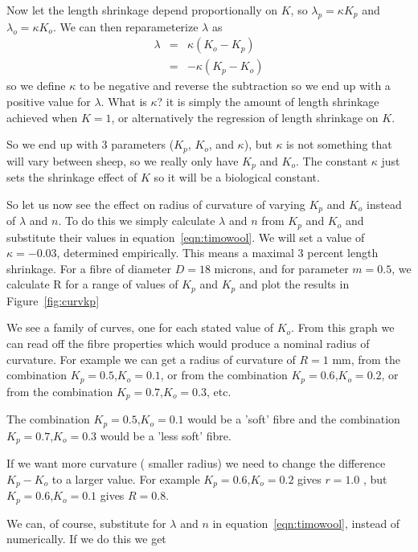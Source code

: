 \documentclass[titlepage]{article}  %
\begin{document}
Now let the length shrinkage depend proportionally on $K$, so $\lambda_{p} = \kappa  K_{p}$ and $\lambda_{o} = \kappa  K_{o}$. We can then reparameterize $\lambda$ as
\begin{eqnarray*}
\lambda & = & \kappa ( K_{o} - K_{p}) \\
      & = & -\kappa ( K_{p} - K_{o})
\end{eqnarray*}
so we define $\kappa$ to be negative  and reverse the subtraction so we end up with a positive value for $\lambda$. What is $\kappa$? it is simply the amount of length shrinkage achieved when $K = 1$, or alternatively the regression of length shrinkage on $K$. 

So we end up with 3 parameters ($K_{p}$, $ K_{o}$, and $\kappa$), but $\kappa$ is  not something that will vary between sheep, so we really only have $K_{p}$ and $ K_{o}$. The constant $\kappa$ just sets the shrinkage effect of $K$ so it will be a biological constant.

So let us now see the effect on radius of curvature of varying $K_{p}$ and $ K_{o}$ instead of $\lambda$ and $n$. To do this we simply calculate $\lambda$ and $n$ from $K_{p}$ and $ K_{o}$ and substitute their values in equation~\ref{eqn:timowool}.
We will set a value of $\kappa = -0.03$, determined empirically. This means a maximal 3 percent length shrinkage. For a fibre of diameter $D = 18$ microns, and for parameter $m = 0.5$, we calculate R for a range of values of $K_{p}$ and $K_{p}$ and plot the results in Figure~\ref{fig:curvkp}

We see a family of curves, one for each stated value of $K_{o}$. From this graph we can read off the fibre properties which would produce a nominal radius of curvature. For example we can get a radius of curvature of $R = 1$ mm, from the combination $K_{p} = 0.5$,$K_{o} = 0.1$, or from the combination $K_{p} = 0.6$,$K_{o} = 0.2$, or from the combination $K_{p} = 0.7$,$K_{o} = 0.3$, etc. 

The combination $K_{p} = 0.5$,$K_{o} = 0.1$ would be a 'soft' fibre and the combination $K_{p} = 0.7$,$K_{o} = 0.3$ would be a 'less soft' fibre. 

If we want more curvature ( smaller radius) we need to change the difference $K_{p} - K_{o}$ to a larger value. For example $K_{p} = 0.6$,$K_{o} = 0.2$ gives $r = 1.0$ , but $K_{p} = 0.6$,$K_{o} = 0.1$ gives $R = 0.8$. 

 We can, of course, substitute for $\lambda$ and $n$ in equation~\ref{eqn:timowool}, instead of numerically. If we do this we get
\end{document}
